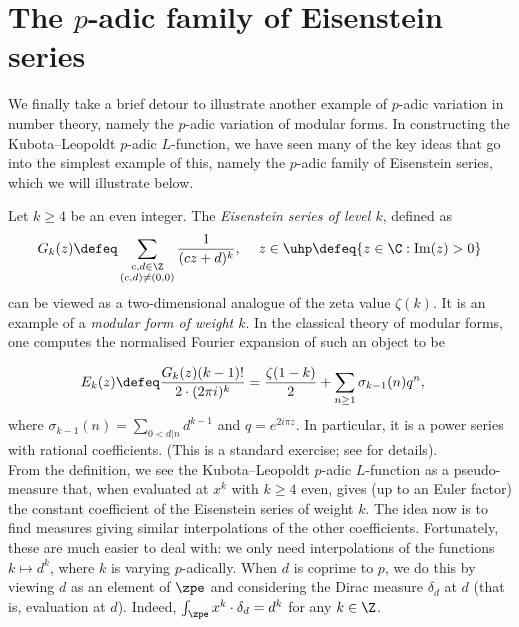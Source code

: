 \documentclass[a4paper,10pt, english, reqno]{smfart}
\numberwithin{equation}{section}
\begin{document}
\section{The $p$-adic family of Eisenstein series}\label{sec:eisenstein}

We finally take a brief detour to illustrate another example of $p$-adic variation in number theory, namely the $p$-adic variation of modular forms. In constructing the Kubota--Leopoldt $p$-adic $L$-function, we have seen many of the key ideas that go into the simplest example of this, namely the $p$-adic family of Eisenstein series, which we will illustrate below. 



Let $k\geq 4$ be an even integer. The \emph{Eisenstein series of level $k$}, defined as
\[G_k(z) \defeq \sum_{\substack{c,d \in \Z\\(c,d) \neq (0,0)}} \frac{1}{(cz+d)^k},\hspace{12pt}z \in \uhp \defeq \{z\in\C: \mathrm{Im}(z) >0\}\]
can be viewed as a two-dimensional analogue of the zeta value $\zeta(k)$. It is an example of a \emph{modular form of weight $k$}. In the classical theory of modular forms, one computes the normalised Fourier expansion of such an object to be

\begin{align*}E_k(z) &\defeq \frac{G_k(z) (k-1)!}{2\cdot (2\pi i)^k} = \frac{\zeta(1-k)}{2} + \sum_{n\geq 1}\sigma_{k-1}(n)q^n,
\end{align*}
where $\sigma_{k-1}(n) = \sum_{0<d|n}d^{k-1}$ and $q = e^{2 i \pi z}$. In particular, it is a power series with rational coefficients. (This is a standard exercise; see \cite[Chapter 1.1]{DS05} for details).\\

From the definition, we see the Kubota--Leopoldt $p$-adic $L$-function as a pseudo-measure that, when evaluated at $x^k$ with $k \geq 4$ even, gives (up to an Euler factor) the constant coefficient of the Eisenstein series of weight $k$. The idea now is to find measures giving similar interpolations of the other coefficients. 
Fortunately, these are much easier to deal with: we only need interpolations of the functions $k \mapsto d^{k}$, where $k$ is varying $p$-adically. When $d$ is coprime to $p$, we do this by viewing $d$ as an element of $\zpe$ and considering the Dirac measure $\delta_d$ at $d$ (that is, evaluation at $d$). Indeed, $\int_{\zpe} x^k \cdot \delta_d = d^{k}$ for any $k \in \Z$.
\end{document}
